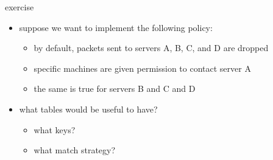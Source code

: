 \begin{frame}{exercise}
    \begin{itemize}
    \item suppose we want to implement the following policy:
        \begin{itemize}
        \item by default, packets sent to servers A, B, C, and D are dropped
        \item specific machines are given permission to contact server A
        \item the same is true for servers B and C and D
        \end{itemize}
    \item what tables would be useful to have?
        \begin{itemize}
        \item what keys?
        \item what match strategy?
        \end{itemize}
    \end{itemize}
\end{frame}
